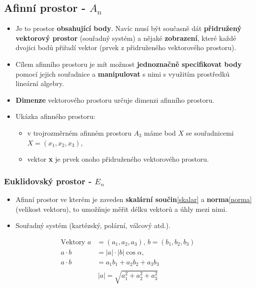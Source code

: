 \subsection{Afinní prostor - $A_n$}
\begin{itemize}
	\item Je to prostor \textbf{obsahující body}. Navíc musí být současně dát \textbf{přidružený vektorový prostor} (souřadný systém) a nějaké \textbf{zobrazení}, které každé dvojici bodů přiřadí vektor (prvek z přidruženého vektorového prostoru).
	\item Cílem afinního prostoru je mít možnost \textbf{jednoznačně specifikovat body} pomocí jejich souřadnice a \textbf{manipulovat} s nimi s využitím prostředků lineární algebry.
	\item \textbf{Dimenze} vektorového prostoru určuje dimenzi afinního prostoru.
	\item Ukázka afinného prostoru:
	\begin{itemize}
		\item v trojrozměrném afinném prostoru $A_3$ máme bod $X$ se souřadnicemi $X=(x_1,x_2,x_3)$,
		\item vektor \textbf{x} je prvek onoho přidruženého vektorového prostoru.
	\end{itemize}
\end{itemize}


\subsubsection{Euklidovský prostor - $E_n$}
\begin{itemize}
	\item Afinní prostor ve kterém je zaveden \textbf{skalární součin}\eqref{skalar} a \textbf{norma}\eqref{norma} (velikost vektoru), to umožňuje měřit délku vektorů a úhly mezi nimi.
	\item Souřadný systém (kartézský, polární, válcový atd.).
\end{itemize}
\begin{equation}
\begin{split}
\label{skalar}
\textrm{Vektory }  a &= (a_1,a_2,a_3), \, b = (b_1,b_2,b_3) \\
 a \cdot b &= |a| \cdot |b| \cos \alpha, \\
 a \cdot b &= a_1b_1 + a_2b_2 +a_3b_3 \\ 
 \end{split}
\end{equation}
\begin{equation}
\label{norma}
 |a| = \sqrt{a_1^2 + a_2^2 + a_3^2} 
\end{equation}

